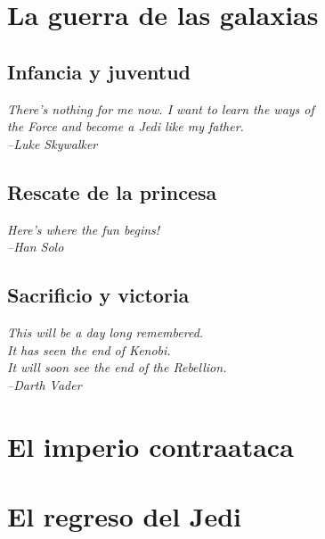 \documentclass[11pt,a4paper,twoside]{tesis}
\begin{document}
\chapter{La guerra de las galaxias}
\section{Infancia y juventud}
{\begin{small}%
\begin{flushright}%
\it
There's nothing for me now.
I want to learn the ways of\\ the Force and become a Jedi like my father. \\
--Luke Skywalker
\end{flushright}%
\end{small}%
\vspace{.5cm}}

\section{Rescate de la princesa}
{\begin{small}%
\begin{flushright}%
\it
Here's where the fun begins!\\
--Han Solo
\end{flushright}%
\end{small}%
\vspace{.5cm}}

\section{Sacrificio y victoria}
{\begin{small}%
\begin{flushright}%
\it
This will be a day long remembered.\\ It has seen the end of Kenobi.\\ It will soon see the end of the Rebellion.\\
--Darth Vader
\end{flushright}%
\end{small}%
\vspace{.5cm}}

\chapter{El imperio contraataca}
\chapter{El regreso del Jedi}

\backmatter

%
%

\end{document}
